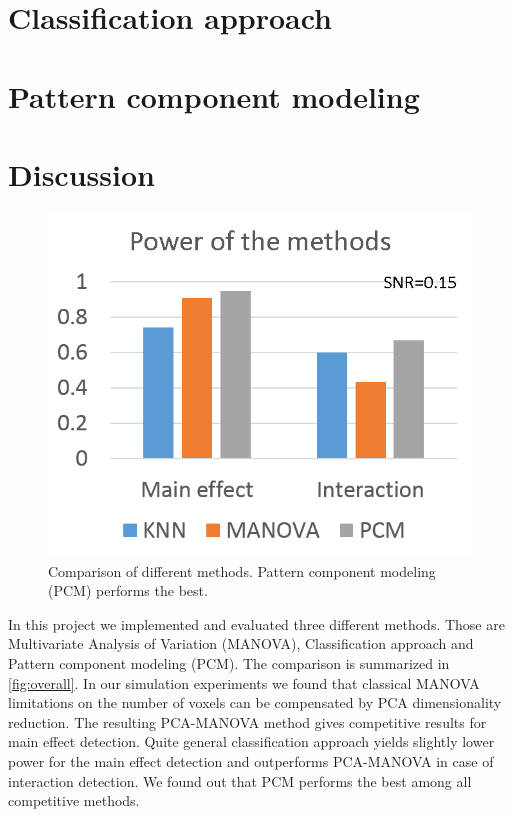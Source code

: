 \documentclass[paper=a4,fontsize=12pt]{scrartcl}
\numberwithin{equation}{section} %
\numberwithin{figure}{section} %
\numberwithin{table}{section} %
\begin{document}
 

\FloatBarrier

\section{Classification approach}\label{sec:classification}



\section{Pattern component modeling}\label{sec:pcm}

\section{Discussion}

\begin{figure}[t]
\centering
\includegraphics{overall.png}
\caption{Comparison of different methods. Pattern component modeling (PCM) performs the best.}
\label{fig:overall}
\end{figure}

In this project we implemented and evaluated three different methods. Those are Multivariate Analysis of Variation (MANOVA), Classification approach and Pattern component modeling (PCM). The comparison is summarized in \autoref{fig:overall}. In our simulation experiments we found that classical MANOVA limitations on the number of voxels can be compensated by PCA dimensionality reduction. The resulting PCA-MANOVA method gives competitive results for main effect detection. Quite general classification approach yields slightly lower power for the main effect detection and outperforms PCA-MANOVA in case of interaction detection. We found out that PCM performs the best among all competitive methods.
\end{document}
